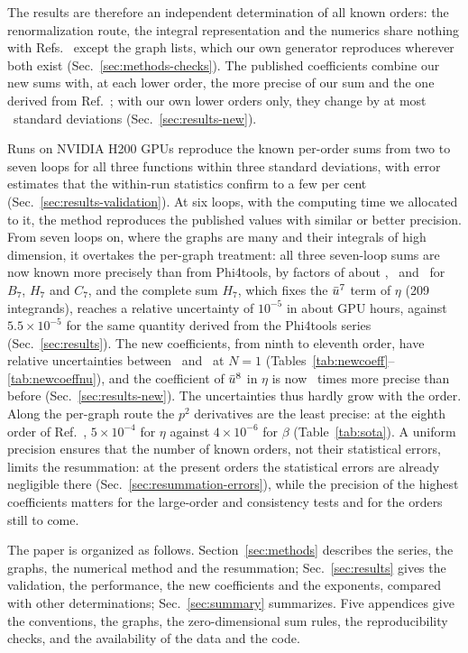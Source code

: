 The results are therefore an independent determination of all known orders: the renormalization route, the
integral representation and the numerics share nothing with Refs.~\cite{NMB1977,Phi4tools2024} except the graph
lists, which our own generator reproduces wherever both exist (Sec.~\ref{sec:methods-checks}). The published coefficients combine our new sums with, at each lower order, the more
precise of our sum and the one derived from Ref.~\cite{Phi4tools2024}; with our own lower orders only, they change
by at most \ledgeronlyzmax\ standard deviations (Sec.~\ref{sec:results-new}).

Runs on NVIDIA H200 GPUs reproduce the known per-order sums from
two to seven loops for all three functions within three standard deviations, with error estimates that the
within-run statistics confirm to a few per cent (Sec.~\ref{sec:results-validation}).
At six loops, with the computing time we allocated to it, the method reproduces the published values with similar or
better precision. From seven loops on, where the graphs are many and their integrals of high dimension, it overtakes
the per-graph treatment: all three seven-loop sums are now known more precisely than
from Phi4tools, by factors of about \precBseven, \precHseven\ and \precCseven\ for $B_7$, $H_7$ and $C_7$, and the
complete sum $H_7$, which fixes the $\bar u^7$ term of $\eta$ (209 integrands), reaches a relative uncertainty of
$10^{-5}$ in about  GPU hours, against $5.5\times10^{-5}$ for the same quantity derived from the Phi4tools
series (Sec.~\ref{sec:results}). The new coefficients, from ninth to eleventh order, have relative uncertainties between
\newrelmin\ and \newrelmax\ at $N=1$ (Tables~\ref{tab:newcoeff}--\ref{tab:newcoeffnu}), and the coefficient of
$\bar u^8$ in $\eta$ is now \etaEightGain\ times more precise than before (Sec.~\ref{sec:results-new}). The
uncertainties thus hardly grow with the order. Along the per-graph route the $p^2$ derivatives are the least precise:
at the eighth order of Ref.~\cite{Phi4tools2024}, $5\times10^{-4}$ for $\eta$ against $4\times10^{-6}$ for $\beta$
(Table~\ref{tab:sota}). A uniform precision ensures that the number of known orders, not their statistical errors,
limits the resummation: at the present orders the statistical errors are already negligible there
(Sec.~\ref{sec:resummation-errors}), while the precision of the highest coefficients matters for the large-order and
consistency tests and for the orders still to come.

The paper is organized as follows. Section~\ref{sec:methods} describes the series, the graphs, the numerical
method and the resummation; Sec.~\ref{sec:results} gives the validation, the performance, the new coefficients and
the exponents, compared with other determinations; Sec.~\ref{sec:summary} summarizes. Five appendices give the conventions, the graphs, the zero-dimensional sum rules, the reproducibility checks, and
the availability of the data and the code.
